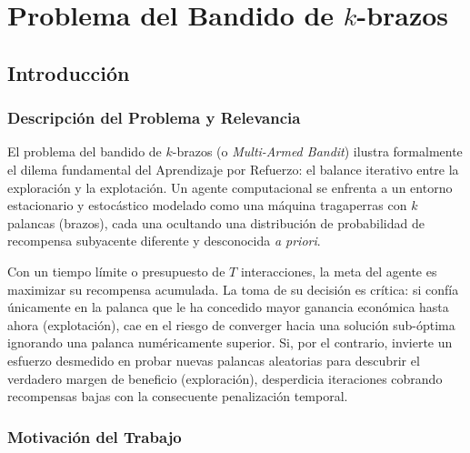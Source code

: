 
\chapter{Problema del Bandido de $k$-brazos}\label{capuxedtulo-1-problema-del-bandido-de-k-brazos}


\section{Introducción}\label{introducciuxf3n}

\subsection{Descripción del Problema y
Relevancia}\label{descripcion-del-problema-y-relevancia}

El problema del bandido de \(k\)-brazos (o \emph{Multi-Armed Bandit})
ilustra formalmente el dilema fundamental del Aprendizaje por Refuerzo:
el balance iterativo entre la exploración y la explotación. Un agente
computacional se enfrenta a un entorno estacionario y estocástico
modelado como una máquina tragaperras con \(k\) palancas (brazos), cada
una ocultando una distribución de probabilidad de recompensa subyacente
diferente y desconocida \emph{a priori}.

Con un tiempo límite o presupuesto de \(T\) interacciones, la meta del
agente es maximizar su recompensa acumulada. La toma de su decisión es
crítica: si confía únicamente en la palanca que le ha concedido mayor
ganancia económica hasta ahora (explotación), cae en el riesgo de
converger hacia una solución sub-óptima ignorando una palanca numéricamente
superior. Si, por el contrario, invierte un esfuerzo desmedido en probar
nuevas palancas aleatorias para descubrir el verdadero margen de
beneficio (exploración), desperdicia iteraciones cobrando recompensas
bajas con la consecuente penalización temporal.

\subsection{Motivación del Trabajo}\label{motivaciuxf3n-del-trabajo}

